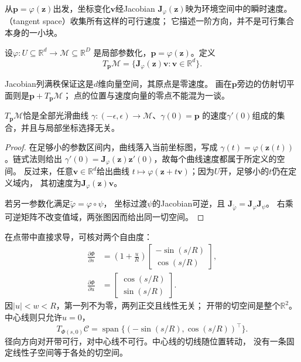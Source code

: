 从$\bm p=\varphi(\bm z)$出发，坐标变化$\bm v$经Jacobian
$\bm J_\varphi(\bm z)$映为环境空间中的瞬时速度。
（tangent space）收集所有这样的可行速度；
它描述一阶方向，并不是可行集合本身的一小块。

\begin{definition}[嵌入流形的切空间]
\label{def:geometry-tangent-space}
设$\varphi:U\subseteq\mathbb R^d\to\mathcal M\subseteq\mathbb R^D$
是局部参数化，$\bm p=\varphi(\bm z)$。定义
\begin{equation}
 T_{\bm p}\mathcal M
 =\{\bm J_\varphi(\bm z)\bm v:\bm v\in\mathbb R^d\}.
 \label{eq:geometry-tangent-space-chart}
\end{equation}
\end{definition}
Jacobian列满秩保证这是$d$维向量空间，其原点是零速度。
画在$\bm p$旁边的仿射切平面则是$\bm p+T_{\bm p}\mathcal M$；
点的位置与速度向量的零点不能混为一谈。

\begin{lemma}[曲线速度与坐标刻画相容]
\label{lem:geometry-tangent-curves}
$T_{\bm p}\mathcal M$恰是全部光滑曲线
$\gamma:(-\epsilon,\epsilon)\to\mathcal M$、$\gamma(0)=\bm p$
的速度$\gamma'(0)$组成的集合，并且与局部坐标选择无关。
\end{lemma}
\begin{proof}
在足够小的参数区间内，曲线落入当前坐标图，写成
$\gamma(t)=\varphi(\bm z(t))$。链式法则给出
$\gamma'(0)=\bm J_\varphi(\bm z)\bm z'(0)$，故每个曲线速度都属于所定义的空间。
反过来，任意$\bm v\in\mathbb R^d$给出曲线
$t\mapsto\varphi(\bm z+t\bm v)$；因为$U$开，足够小的$t$仍在定义域内，
其初速度为$\bm J_\varphi(\bm z)\bm v$。

若另一参数化满足$\widetilde\varphi=\varphi\circ\psi$，
坐标过渡$\psi$的Jacobian可逆，且
$\bm J_{\widetilde\varphi}=\bm J_\varphi\bm J_\psi$。
右乘可逆矩阵不改变值域，两张图因而给出同一切空间。
\end{proof}

在点带中直接求导，可核对两个自由度：
\begin{align}
 \frac{\partial\Phi}{\partial s}
 &=\left(1+\frac uR\right)
   \begin{bmatrix}-\sin(s/R)\\\cos(s/R)\end{bmatrix},
 \label{eq:geometry-strip-s-tangent}\\
 \frac{\partial\Phi}{\partial u}
 &=\begin{bmatrix}\cos(s/R)\\\sin(s/R)\end{bmatrix}.
 \label{eq:geometry-strip-u-tangent}
\end{align}
因$|u|<w<R$，第一列不为零，两列正交且线性无关；
开带的切空间是整个$\mathbb R^2$。中心线则只允许$u=0$，
\[
 T_{\Phi(s,0)}\mathcal C
 =\operatorname{span}\{(-\sin(s/R),\cos(s/R))^\top\}.
\]
径向方向对开带可行，对中心线不可行。中心线的切线随位置转动，
没有一条固定线性子空间等于各处的切空间。

